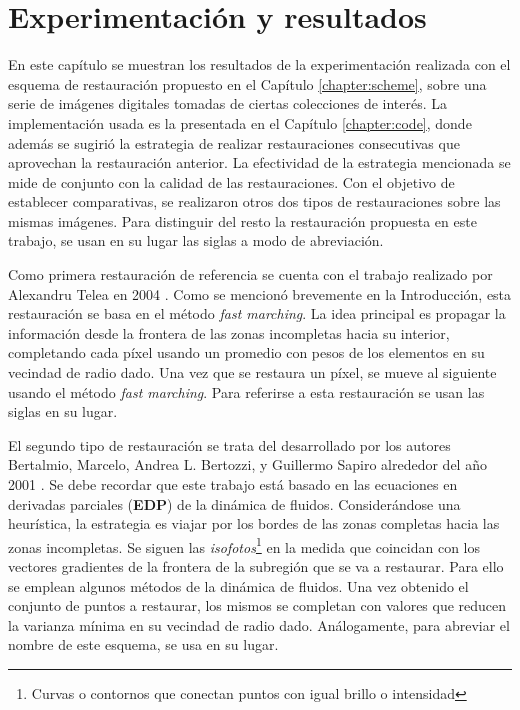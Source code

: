 \chapter{Experimentaci\'on y resultados}\label{chapter:results}
En este cap\'itulo se muestran los resultados de la experimentaci\'on realizada con el esquema de restauraci\'on propuesto en el Cap\'itulo \ref{chapter:scheme}, sobre una serie de im\'agenes digitales tomadas de ciertas colecciones de inter\'es. La implementaci\'on usada es la presentada en el Cap\'itulo \ref{chapter:code}, donde adem\'as se sugiri\'o la estrategia de realizar restauraciones consecutivas que aprovechan la restauraci\'on anterior. La efectividad de la estrategia mencionada se mide de conjunto con la calidad de las restauraciones. Con el objetivo de establecer comparativas, se realizaron otros dos tipos de restauraciones sobre las mismas im\'agenes. Para distinguir del resto la restauraci\'on propuesta en este trabajo, se usan en su lugar las siglas \SOP a modo de abreviaci\'on.

Como primera restauraci\'on de referencia se cuenta con el trabajo realizado por Alexandru Telea en 2004 \cite{telea2004image}. Como se mencion\'o brevemente en la Introducci\'on, esta restauraci\'on se basa en el m\'etodo \textit{fast marching}. La idea principal es propagar la informaci\'on desde la frontera de las zonas incompletas hacia su interior, completando cada p\'ixel usando un promedio con pesos de los elementos en su vecindad de radio dado. Una vez que se restaura un p\'ixel, se mueve al siguiente usando el m\'etodo \textit{fast marching}. Para referirse a esta restauraci\'on se usan las siglas \TELEA en su lugar.

El segundo tipo de restauraci\'on se trata del desarrollado por los autores Bertalmio, Marcelo, Andrea L. Bertozzi, y Guillermo Sapiro alrededor del año 2001 \cite{bertalmio2001navier}. Se debe recordar que este trabajo est\'a basado en las ecuaciones en derivadas parciales (\textbf{EDP}) de la din\'amica de fluidos. Considerándose una heur\'istica, la estrategia es viajar por los bordes de las zonas completas hacia las zonas incompletas. Se siguen las \textit{isofotos}\footnote{Curvas o contornos que conectan puntos con igual brillo o intensidad} en la medida que coincidan con los vectores gradientes de la frontera de la subregi\'on que se va a restaurar. Para ello se emplean algunos m\'etodos de la din\'amica de fluidos. Una vez obtenido el conjunto de puntos a restaurar, los mismos se completan con valores que reducen la varianza m\'inima en su vecindad de radio dado. An\'alogamente, para abreviar el nombre de este esquema, se usa \NS en su lugar.

